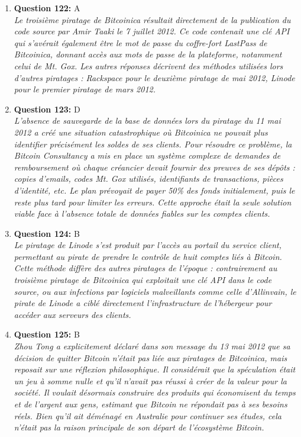 \documentclass[12pt,a4paper]{article}
\begin{document}
\begin{enumerate}
\item \textbf{Question 122:} A
\\ \textit{Le troisième piratage de Bitcoinica résultait directement de la publication du code source par Amir Taaki le 7 juillet 2012. Ce code contenait une clé API qui s'avérait également être le mot de passe du coffre-fort LastPass de Bitcoinica, donnant accès aux mots de passe de la plateforme, notamment celui de Mt. Gox. Les autres réponses décrivent des méthodes utilisées lors d'autres piratages : Rackspace pour le deuxième piratage de mai 2012, Linode pour le premier piratage de mars 2012.}

\item \textbf{Question 123:} D
\\ \textit{L'absence de sauvegarde de la base de données lors du piratage du 11 mai 2012 a créé une situation catastrophique où Bitcoinica ne pouvait plus identifier précisément les soldes de ses clients. Pour résoudre ce problème, la Bitcoin Consultancy a mis en place un système complexe de demandes de remboursement où chaque créancier devait fournir des preuves de ses dépôts : copies d'emails, codes Mt. Gox utilisés, identifiants de transactions, pièces d'identité, etc. Le plan prévoyait de payer 50\% des fonds initialement, puis le reste plus tard pour limiter les erreurs. Cette approche était la seule solution viable face à l'absence totale de données fiables sur les comptes clients.}

\item \textbf{Question 124:} B
\\ \textit{Le piratage de Linode s'est produit par l'accès au portail du service client, permettant au pirate de prendre le contrôle de huit comptes liés à Bitcoin. Cette méthode diffère des autres piratages de l'époque : contrairement au troisième piratage de Bitcoinica qui exploitait une clé API dans le code source, ou aux infections par logiciels malveillants comme celle d'Allinvain, le pirate de Linode a ciblé directement l'infrastructure de l'hébergeur pour accéder aux serveurs des clients.}

\item \textbf{Question 125:} B
\\ \textit{Zhou Tong a explicitement déclaré dans son message du 13 mai 2012 que sa décision de quitter Bitcoin n'était pas liée aux piratages de Bitcoinica, mais reposait sur une réflexion philosophique. Il considérait que la spéculation était un jeu à somme nulle et qu'il n'avait pas réussi à créer de la valeur pour la société. Il voulait désormais construire des produits qui économisent du temps et de l'argent aux gens, estimant que Bitcoin ne répondait pas à ses besoins réels. Bien qu'il ait déménagé en Australie pour continuer ses études, cela n'était pas la raison principale de son départ de l'écosystème Bitcoin.}


\end{enumerate}
\end{document}
